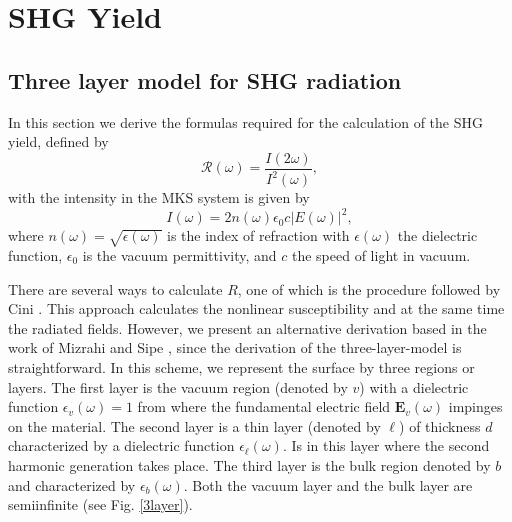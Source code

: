 \chapter{SHG Yield}

\section{Three layer model for SHG radiation}

In this section we derive the formulas required for the calculation of the SHG
yield, defined by
\begin{equation}\label{uno}
\mathcal{R}(\omega)=\frac{I(2\omega)}{I^2(\omega)}
,
\end{equation}
with the intensity in the MKS system is given by\cite{boyd}
\begin{equation}\label{dos}
I(\omega)=2n(\omega)\epsilon_{0}c|E(\omega)|^2,
\end{equation}
where $n(\omega)=\sqrt{\epsilon(\omega)}$ is the index of refraction with
$\epsilon(\omega)$ the dielectric function, $\epsilon_{0}$ is the vacuum permittivity,
and $c$ the speed of light in vacuum.

There are several ways to calculate $R$, one of which is the procedure followed
by Cini \cite{ciniPRB91}. This approach calculates the nonlinear susceptibility
and at the same time the radiated fields. However, we present an alternative
derivation based in the work of Mizrahi and Sipe \cite{mizrahiJOSA88}, since
the derivation of the three-layer-model is straightforward. 
In this scheme, 
we represent the surface by three regions or layers. The first layer
is the vacuum region (denoted by $v$) with a dielectric function $\epsilon_v(\omega)=1$ from
where the fundamental electric field $\mathbf{E}_{v}(\omega)$ impinges on the material. 
The second  layer is a thin layer (denoted by $\ell$) of thickness $d$ characterized
by a dielectric function $\epsilon_\ell(\omega)$. Is in this layer where the
second harmonic generation takes place. The third layer is the bulk
region denoted by $b$ and characterized by $\epsilon_b(\omega)$. 
Both the vacuum layer and the
bulk layer are semiinfinite  (see Fig. \ref{3layer}). 

